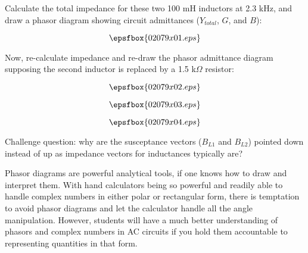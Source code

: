 

Calculate the total impedance for these two 100 mH inductors at 2.3 kHz, and draw a phasor diagram showing circuit admittances ($Y_{total}$, $G$, and $B$):

$$\epsfbox{02079x01.eps}$$

Now, re-calculate impedance and re-draw the phasor admittance diagram supposing the second inductor is replaced by a 1.5 k$\Omega$ resistor:

$$\epsfbox{02079x02.eps}$$







$$\epsfbox{02079x03.eps}$$

$$\epsfbox{02079x04.eps}$$

\vskip 10pt

Challenge question: why are the susceptance vectors ($B_{L1}$ and $B_{L2}$) pointed down instead of up as impedance vectors for inductances typically are?







Phasor diagrams are powerful analytical tools, if one knows how to draw and interpret them.  With hand calculators being so powerful and readily able to handle complex numbers in either polar or rectangular form, there is temptation to avoid phasor diagrams and let the calculator handle all the angle manipulation.  However, students will have a much better understanding of phasors and complex numbers in AC circuits if you hold them accountable to representing quantities in that form.




